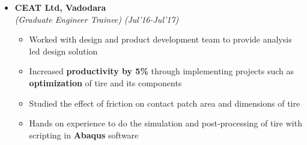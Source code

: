 \documentclass[a4paper,10pt]{article}
\begin{document}
\begin{itemize}%

\item \textbf{CEAT Ltd, Vadodara}\\
\emph{(Graduate Engineer Trainee)} \hfill \emph{(Jul'16-Jul'17)}
    \vspace{-0.05cm}
	\begin{itemize}[noitemsep,nolistsep]
	\item Worked with design and product development team to provide analysis led design solution
	\item Increased \textbf{productivity by 5\%} through implementing projects such as \textbf{optimization} of tire and its components
	\item Studied the effect of friction on contact patch area and dimensions of tire
	\item Hands on experience to do the simulation and post-processing of tire with scripting in \textbf{Abaqus} software
    \end{itemize}
    
\end{itemize}
\end{document}
